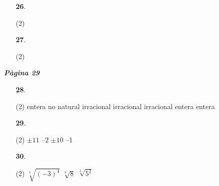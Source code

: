 \documentclass[a4paper, pdf, twoside]{book}
\begin{document}
\begin{multicols}{2}
\begin{enumerate}

 \item[\fontfamily{phv}\selectfont\color{blue}\textbf{26}. ] 
 \begin{tasks}[column-sep=1em, item-indent=1.3333em](2)
\end{tasks}
\vspace{0.25cm}



 \item[\fontfamily{phv}\selectfont\color{blue}\textbf{27}. ] 
 \begin{tasks}[column-sep=1em, item-indent=1.3333em](2)
\end{tasks}
 \end{enumerate}
\vspace{0.3cm}


{\textbf{\em Pàgina 29}} \hrulefill
\begin{enumerate}
\vspace{0.25cm}



 \item[\fontfamily{phv}\selectfont\color{blue}\textbf{28}. ] 
 \begin{tasks}[column-sep=1em, item-indent=1.3333em](2)
	 \task entera
	 \task no
	 \task natural
	 \task irracional
	 \task irracional
	 \task irracional
	 \task entera
	 \task entera
\end{tasks}
 \end{enumerate}
\begin{enumerate}
\vspace{0.25cm}



 \item[\fontfamily{phv}\selectfont\color{blue}\textbf{29}. ] 
 \begin{tasks}[column-sep=1em, item-indent=1.3333em](2)
	 \task $\pm 11$
	 \task --2
	 \task $\pm 10$
	 \task --1
\end{tasks}
\vspace{0.25cm}



 \item[\fontfamily{phv}\selectfont\color{blue}\textbf{30}. ] 
 \begin{tasks}[column-sep=1em, item-indent=1.3333em](2)
	 \task $\sqrt [5]{(-3)^4}$
	 \task $\sqrt [3]{8}$
	 \task $\sqrt [3]{5^2}$
\end{tasks}
\vspace{0.25cm}



\end{enumerate}
\end{multicols}
\end{document}
